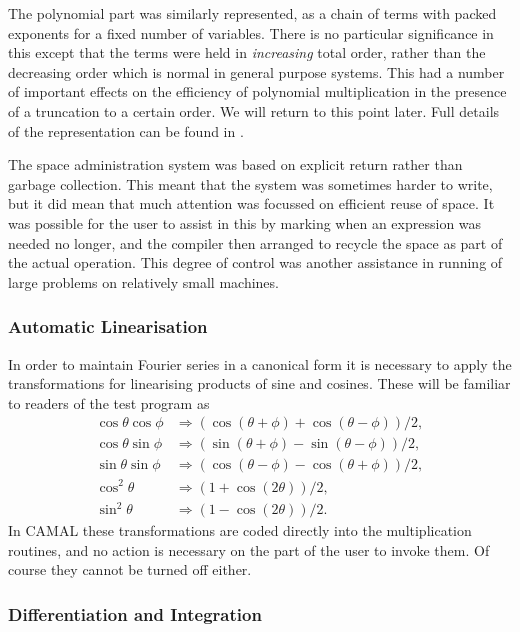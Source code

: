The polynomial part was similarly represented, as a chain of terms
with packed exponents for a fixed number of variables.  There is no
particular significance in this except that the terms were held in
\emph{increasing} total order, rather than the decreasing order which
is normal in general purpose systems.  This had a number of important
effects on the efficiency of polynomial multiplication in the presence
of a truncation to a certain order.  We will return to this point
later.  Full details of the representation can be found in
\cite{Fitch:LN75}.

The space administration system was based on explicit return rather
than garbage collection.  This meant that the system was sometimes
harder to write, but it did mean that much attention was focussed on
efficient reuse of space.  It was possible for the user to assist in
this by marking when an expression was needed no longer, and the
compiler then arranged to recycle the space as part of the actual
operation.  This degree of control was another assistance in running
of large problems on relatively small machines.

\subsubsection{Automatic Linearisation}

In order to maintain Fourier series in a canonical form it is
necessary to apply the transformations for linearising products of
sine and cosines.  These will be familiar to readers of the \REDUCE
test program as
\begin{align}
\cos \theta \cos \phi & \Rightarrow
                (\cos(\theta+\phi)+\cos(\theta-\phi))/2, \\
\cos \theta \sin \phi & \Rightarrow
                (\sin(\theta+\phi)-\sin(\theta-\phi))/2, \\
\sin \theta \sin \phi & \Rightarrow
                (\cos(\theta-\phi)-\cos(\theta+\phi))/2, \\
\cos^2 \theta & \Rightarrow (1+\cos(2\theta))/2,      \\
\sin^2 \theta & \Rightarrow (1-\cos(2\theta))/2.
\end{align}
In CAMAL these transformations are coded directly into the
multiplication routines, and no action is necessary on the part of the
user to invoke them.  Of course they cannot be turned off either.

\subsubsection{Differentiation and Integration}

